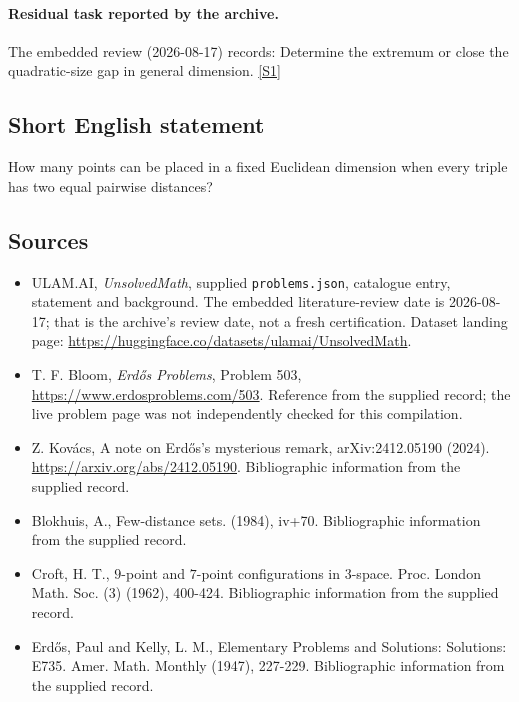 \documentclass[11pt,a4paper]{article}
\newcommand{\sref}[2]{\hyperlink{source:#1:#2}{[S#2]}}
\begin{document}
\paragraph{Residual task reported by the archive.}

The embedded review (2026-08-17) records: Determine the extremum or close the quadratic-size gap in general dimension. \sref{statement}{1}

\subsection{Short English statement}

How many points can be placed in a fixed Euclidean dimension when every triple has two equal pairwise distances?

\subsection{Sources}

{\small

\begin{itemize}

\item[\hypertarget{source:statement:1}{S1}] ULAM.AI, \emph{UnsolvedMath}, supplied \texttt{problems.json}, catalogue entry, statement and background. The embedded literature-review date is 2026-08-17; that is the archive’s review date, not a fresh certification. Dataset landing page: \url{https://huggingface.co/datasets/ulamai/UnsolvedMath}.

\item[\hypertarget{source:statement:2}{S2}] T. F. Bloom, \emph{Erdős Problems}, Problem 503, \url{https://www.erdosproblems.com/503}. Reference from the supplied record; the live problem page was not independently checked for this compilation.

\item[\hypertarget{source:statement:3}{S3}] Z. Kovács, A note on Erdős's mysterious remark, arXiv:2412.05190 (2024). \url{https://arxiv.org/abs/2412.05190}. Bibliographic information from the supplied record.

\item[\hypertarget{source:statement:4}{S4}] Blokhuis, A., Few-distance sets. (1984), iv+70. Bibliographic information from the supplied record.

\item[\hypertarget{source:statement:5}{S5}] Croft, H. T., $9$-point and $7$-point configurations in $3$-space. Proc. London Math. Soc. (3) (1962), 400-424. Bibliographic information from the supplied record.

\item[\hypertarget{source:statement:6}{S6}] Erd\H{o}s, Paul and Kelly, L. M., Elementary Problems and Solutions: Solutions: E735. Amer. Math. Monthly (1947), 227-229. Bibliographic information from the supplied record.

\end{itemize}

}

\label{end:statement}
\end{document}
